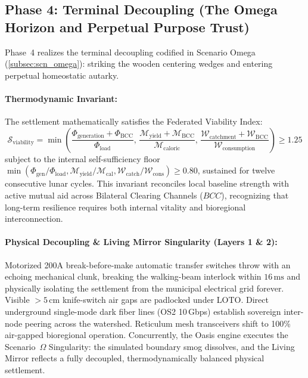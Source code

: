 \subsection{Phase 4: Terminal Decoupling (The Omega Horizon and Perpetual Purpose Trust)}
\label{subsec:phase4_omega}

Phase~4 realizes the terminal decoupling codified in Scenario Omega (\ref{subsec:scn_omega}): striking the wooden centering wedges and entering perpetual homeostatic autarky.

\paragraph{Thermodynamic Invariant:} The settlement mathematically satisfies the Federated Viability Index:
\begin{equation}
\mathcal{S}_{\mathrm{viability}} = \min\left( 
    \frac{\Phi_{\mathrm{generation}} + \Phi_{\mathrm{BCC}}}{\Phi_{\mathrm{load}}}, \, 
    \frac{\mathcal{M}_{\mathrm{yield}} + \mathcal{M}_{\mathrm{BCC}}}{\mathcal{M}_{\mathrm{caloric}}}, \, 
    \frac{\mathcal{W}_{\mathrm{catchment}} + \mathcal{W}_{\mathrm{BCC}}}{\mathcal{W}_{\mathrm{consumption}}} 
\right) \ge 1.25
\label{eq:autarky_index}
\end{equation}
subject to the internal self-sufficiency floor $\min(\Phi_{\mathrm{gen}}/\Phi_{\mathrm{load}}, \mathcal{M}_{\mathrm{yield}}/\mathcal{M}_{\mathrm{cal}}, \mathcal{W}_{\mathrm{catch}}/\mathcal{W}_{\mathrm{cons}}) \ge 0.80$, sustained for twelve consecutive lunar cycles. This invariant reconciles local baseline strength with active mutual aid across Bilateral Clearing Channels ($BCC$), recognizing that long-term resilience requires both internal vitality and bioregional interconnection.

\paragraph{Physical Decoupling \& Living Mirror Singularity (Layers 1 \& 2):} Motorized 200A break-before-make automatic transfer switches throw with an echoing mechanical clunk, breaking the walking-beam interlock within $16\,\mathrm{ms}$ and physically isolating the settlement from the municipal electrical grid forever. Visible $>5\,\mathrm{cm}$ knife-switch air gaps are padlocked under LOTO. Direct underground single-mode dark fiber lines (OS2 10\,Gbps) establish sovereign inter-node peering across the watershed. Reticulum mesh transceivers shift to 100\% air-gapped bioregional operation. Concurrently, the Oasis engine executes the Scenario~$\Omega$ Singularity: the simulated boundary smog dissolves, and the Living Mirror reflects a fully decoupled, thermodynamically balanced physical settlement.
